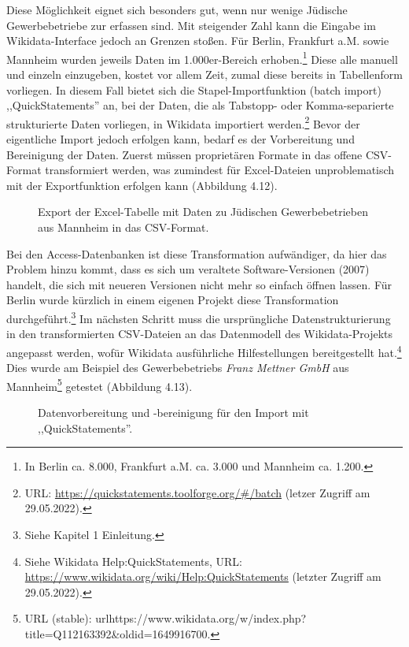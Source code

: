 Diese Möglichkeit eignet sich besonders gut, wenn nur wenige Jüdische Gewerbebetriebe zur erfassen sind. Mit steigender Zahl kann die Eingabe im Wikidata-Interface jedoch an Grenzen stoßen. Für Berlin, Frankfurt a.M. sowie Mannheim wurden jeweils Daten im 1.000er-Bereich erhoben.\footnote{In Berlin ca. 8.000, Frankfurt a.M. ca. 3.000 und Mannheim ca. 1.200.} Diese alle manuell und einzeln einzugeben, kostet vor allem Zeit, zumal diese bereits in Tabellenform vorliegen. In diesem Fall bietet sich die Stapel-Importfunktion (batch import) ,,QuickStatements'' an, bei der Daten, die als Tabstopp- oder Komma-separierte strukturierte Daten vorliegen, in Wikidata importiert werden.\footnote{URL: \url{https://quickstatements.toolforge.org/\#/batch} (letzer Zugriff am 29.05.2022).} Bevor der eigentliche Import jedoch erfolgen kann, bedarf es der Vorbereitung und Bereinigung der Daten. Zuerst müssen proprietären Formate in das offene CSV-Format transformiert werden, was zumindest für Excel-Dateien unproblematisch mit der Exportfunktion erfolgen kann (Abbildung 4.12).

\begin{figure}[h]
    \centering
    \caption{Export der Excel-Tabelle mit Daten zu Jüdischen Gewerbebetrieben aus Mannheim in das CSV-Format.}
    \label{fig:x cubed graph}
\end{figure}

Bei den Access-Datenbanken ist diese Transformation aufwändiger, da hier das Problem hinzu kommt, dass es sich um veraltete Software-Versionen (2007) handelt, die sich mit neueren Versionen nicht mehr so einfach öffnen lassen. Für Berlin wurde kürzlich in einem eigenen Projekt diese Transformation durchgeführt.\footnote{Siehe Kapitel 1 Einleitung.} Im nächsten Schritt muss die ursprüngliche Datenstrukturierung in den transformierten CSV-Dateien an das Datenmodell des Wikidata-Projekts angepasst werden, wofür Wikidata ausführliche Hilfestellungen bereitgestellt hat.\footnote{Siehe Wikidata Help:QuickStatements, URL: \url{https://www.wikidata.org/wiki/Help:QuickStatements} (letzter Zugriff am 29.05.2022).} Dies wurde am Beispiel des Gewerbebetriebs \textit{Franz Mettner GmbH} aus Mannheim\footnote{URL (stable): url{https://www.wikidata.org/w/index.php?title=Q112163392\&oldid=1649916700}.} getestet (Abbildung 4.13).

\begin{figure}[h]
    \centering
    \caption{Datenvorbereitung und -bereinigung für den Import mit ,,QuickStatements''.}
    \label{fig:x cubed graph}
\end{figure}

